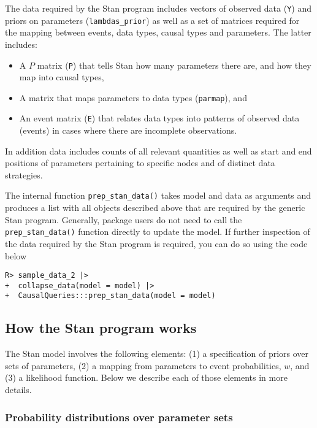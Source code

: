 \documentclass[
  11pt,
  article]{jss}
\providecommand{\tightlist}{%
  \setlength{\itemsep}{0pt}\setlength{\parskip}{0pt}}\usepackage{longtable,booktabs,array}
\begin{document}
The data required by the Stan program includes vectors of observed data
(\texttt{Y}) and priors on parameters (\texttt{lambdas\_prior}) as well
as a set of matrices required for the mapping between events, data
types, causal types and parameters. The latter includes:

\begin{itemize}
\tightlist
\item
  A \(P\) matrix (\texttt{P}) that tells Stan how many parameters there
  are, and how they map into causal types,
\item
  A matrix that maps parameters to data types (\texttt{parmap}), and
\item
  An event matrix (\texttt{E}) that relates data types into patterns of
  observed data (events) in cases where there are incomplete
  observations.
\end{itemize}

In addition data includes counts of all relevant quantities as well as
start and end positions of parameters pertaining to specific nodes and
of distinct data strategies.

The internal function \texttt{prep\_stan\_data()} takes model and data
as arguments and produces a list with all objects described above that
are required by the generic Stan program. Generally, package users do
not need to call the \texttt{prep\_stan\_data()} function directly to
update the model. If further inspection of the data required by the Stan
program is required, you can do so using the code below

\begin{verbatim}
R> sample_data_2 |> 
+  collapse_data(model = model) |> 
+  CausalQueries:::prep_stan_data(model = model)
\end{verbatim}

\hypertarget{how-the-stan-program-works}{%
\subsection{How the Stan program
works}\label{how-the-stan-program-works}}

The Stan model involves the following elements: (1) a specification of
priors over sets of parameters, (2) a mapping from parameters to event
probabilities, \(w\), and (3) a likelihood function. Below we describe
each of those elements in more details.

\hypertarget{probability-distributions-over-parameter-sets}{%
\subsubsection{Probability distributions over parameter
sets}\label{probability-distributions-over-parameter-sets}}
\end{document}
